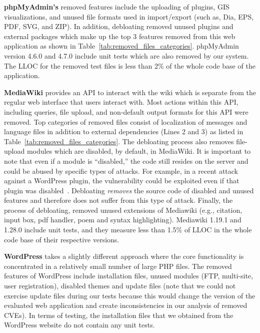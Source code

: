 \vspace{0.5ex}
\noindent\textbf{phpMyAdmin's} removed features include the uploading of plugins, GIS visualizations, and unused file formats used in import/export (such as, Dia, EPS, PDF, SVG, and ZIP). In addition, debloating removed unused plugins and external packages which make up the top 3 features removed from this web application as shown in Table~\ref{tab:removed_files_categories}. phpMyAdmin version 4.6.0 and 4.7.0 include unit tests which are also removed by our system. The LLOC for the removed test files is less than 2\% of the whole code base of the application.

\vspace{0.5ex}
\noindent\textbf{MediaWiki} provides an API to interact with the wiki which is separate from the regular web interface that users interact with. Most actions within this API, including queries, file upload, and non-default output formats for this API were removed. Top categories of removed files consist of localization of messages and language files in addition to external dependencies (Lines 2 and 3) as listed in Table~\ref{tab:removed_files_categories}. The debloating process also removes file-upload modules which are disabled, by default, in MediaWiki. It is important to note that even if a module is ``disabled,'' the code still resides on the server and could be abused by specific types of attacks. For example, in a recent attack against a WordPress plugin, the vulnerability could be exploited even if that plugin was disabled~\cite{wordpressPlugin}. Debloating \textit{removes} the source code of disabled and unused features and therefore does not suffer from this type of attack.
Finally, the process of debloating, removed unused extensions of Mediawiki (e.g., citation, input box, pdf handler, poem and syntax highlighting). Mediawiki 1.19.1 and 1.28.0 include unit tests, and they measure less than 1.5\% of LLOC in the whole code base of their respective versions.

\vspace{0.5ex}
\noindent\textbf{WordPress} takes a slightly different approach where the core functionality is concentrated in a relatively small number of large PHP files. The removed features of WordPress include installation files, unused modules (FTP, multi-site, user registration), disabled themes and update files (note that we could not exercise update files during our tests because this would change the version of the evaluated web application and create inconsistencies in our analysis of removed CVEs). In terms of testing, the installation files that we obtained from the WordPress website do not contain any unit tests.

